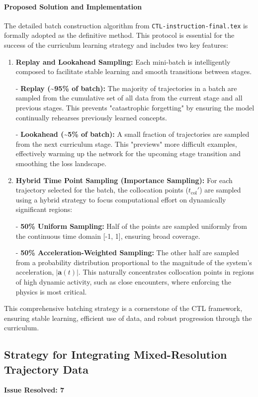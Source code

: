 \paragraph{Proposed Solution and Implementation}
The detailed batch construction algorithm from \texttt{CTL-instruction-\allowbreak final.tex} is formally adopted as the definitive method. This protocol is essential for the success of the curriculum learning strategy and includes two key features:
\begin{enumerate}
    \item \textbf{Replay and Lookahead Sampling:} Each mini-batch is intelligently composed to facilitate stable learning and smooth transitions between stages.


- \textbf{Replay (\textasciitilde 95\% of batch):} The majority of trajectories in a batch are sampled from the cumulative set of all data from the current stage and all previous stages. This prevents "catastrophic forgetting" by ensuring the model continually rehearses previously learned concepts.

- \textbf{Lookahead (\textasciitilde 5\% of batch):} A small fraction of trajectories are sampled from the next curriculum stage. This "previews" more difficult examples, effectively warming up the network for the upcoming stage transition and smoothing the loss landscape.

    \item \textbf{Hybrid Time Point Sampling (Importance Sampling):} For each trajectory selected for the batch, the collocation points ($t_{\text{col}}'$) are sampled using a hybrid strategy to focus computational effort on dynamically significant regions:


- \textbf{50\% Uniform Sampling:} Half of the points are sampled uniformly from the continuous time domain [-1, 1], ensuring broad coverage.

- \textbf{50\% Acceleration-Weighted Sampling:} The other half are sampled from a probability distribution proportional to the magnitude of the system's acceleration, $|\mathbf{a}(t)|$. This naturally concentrates collocation points in regions of high dynamic activity, such as close encounters, where enforcing the physics is most critical.

\end{enumerate}
This comprehensive batching strategy is a cornerstone of the CTL framework, ensuring stable learning, efficient use of data, and robust progression through the curriculum.

\subsection{Strategy for Integrating Mixed-Resolution Trajectory Data}
\textbf{Issue Resolved: 7}
